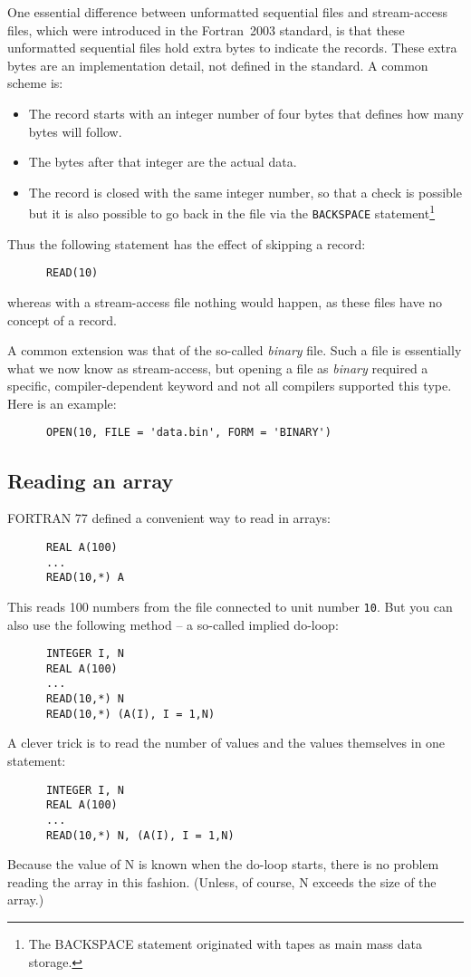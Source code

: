 One essential difference between unformatted sequential files and stream-access files,
which were introduced in the Fortran~2003 standard, is that these unformatted sequential files
hold extra bytes to indicate the records. These extra bytes are an implementation detail,
not defined in the standard. A common scheme is:
\begin{itemize}
\item
The record starts with an integer number of four bytes that defines how many bytes
will follow.
\item
The bytes after that integer are the actual data.
\item
The record is closed with the same integer number, so that a check is possible but it
is also possible to go back in the file via the \verb+BACKSPACE+ statement\footnote{The
BACKSPACE statement originated with tapes as main mass data storage.}
\end{itemize}

Thus the following statement has the effect of skipping a record:
%
\begin{verbatim}
      READ(10)
\end{verbatim}
%
\noindent whereas with a stream-access file nothing would happen, as these files have no
concept of a record.

A common extension was that of the so-called \emph{binary} file. Such a file is essentially
what we now know as stream-access, but opening a file as \emph{binary} required a specific,
compiler-dependent keyword and not all compilers supported this type. Here is an example:
%
\begin{verbatim}
      OPEN(10, FILE = 'data.bin', FORM = 'BINARY')
\end{verbatim}


\subsection{Reading an array}
FORTRAN 77 defined a convenient way to read in arrays:
%
\begin{verbatim}
      REAL A(100)
      ...
      READ(10,*) A
\end{verbatim}
%
This reads 100 numbers from the file connected to unit number \verb+10+. But you can
also use the following method -- a so-called implied do-loop:
%
\begin{verbatim}
      INTEGER I, N
      REAL A(100)
      ...
      READ(10,*) N
      READ(10,*) (A(I), I = 1,N)
\end{verbatim}
%
A clever trick is to read the number of values and the values themselves in one statement:
%
\begin{verbatim}
      INTEGER I, N
      REAL A(100)
      ...
      READ(10,*) N, (A(I), I = 1,N)
\end{verbatim}
%
Because the value of N is known when the do-loop starts, there is no problem reading
the array in this fashion. (Unless, of course, N exceeds the size of the array.)
